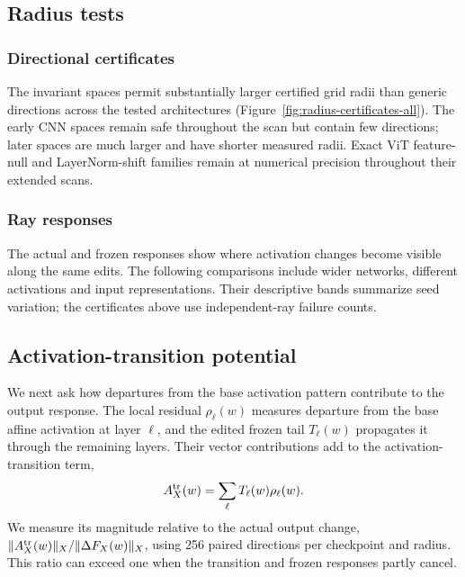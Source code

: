 

\subsection{Radius tests}
\label{app:radius-results}
\subsubsection{Directional certificates}
\label{app:radius-certificates}
The invariant spaces permit substantially larger certified grid radii than generic directions across the tested architectures (Figure~\ref{fig:radius-certificates-all}). The early CNN spaces remain safe throughout the scan but contain few directions; later spaces are much larger and have shorter measured radii. Exact ViT feature-null and LayerNorm-shift families remain at numerical precision throughout their extended scans.


\FloatBarrier

\subsubsection{Ray responses}\label{app:radius-responses}
The actual and frozen responses show where activation changes become visible along the same edits. The following comparisons include wider networks, different activations and input representations. Their descriptive bands summarize seed variation; the certificates above use independent-ray failure counts.


\subsection{Activation-transition potential}
\label{app:transition}
We next ask how departures from the base activation pattern contribute to the output response. The local residual $\rho_\ell(w)$ measures departure from the base affine activation at layer $\ell$, and the edited frozen tail $T_\ell(w)$ propagates it through the remaining layers. Their vector contributions add to the activation-transition term,
\[
 A_X^{\rm tr}(w)=\sum_\ell T_\ell(w)\rho_\ell(w).
\]
We measure its magnitude relative to the actual output change, $\|A_X^{\rm tr}(w)\|_X/\|\Delta F_X(w)\|_X$, using 256 paired directions per checkpoint and radius. This ratio can exceed one when the transition and frozen responses partly cancel.

